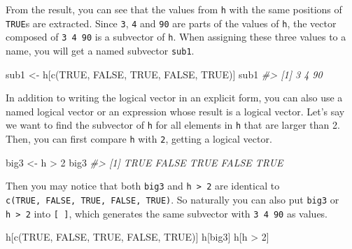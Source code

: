 \documentclass[
]{book}
\newenvironment{Shaded}{\begin{snugshade}}{\end{snugshade}}
\newcommand{\CommentTok}[1]{\textcolor[rgb]{0.56,0.35,0.01}{\textit{#1}}}
\newcommand{\ConstantTok}[1]{\textcolor[rgb]{0.00,0.00,0.00}{#1}}
\newcommand{\DecValTok}[1]{\textcolor[rgb]{0.00,0.00,0.81}{#1}}
\newcommand{\FunctionTok}[1]{\textcolor[rgb]{0.00,0.00,0.00}{#1}}
\newcommand{\NormalTok}[1]{#1}
\newcommand{\OtherTok}[1]{\textcolor[rgb]{0.56,0.35,0.01}{#1}}
\newcommand{\SpecialCharTok}[1]{\textcolor[rgb]{0.00,0.00,0.00}{#1}}
\begin{document}
From the result, you can see that the values from \texttt{h} with the same positions of \texttt{TRUE}s are extracted. Since \texttt{3}, \texttt{4} and \texttt{90} are parts of the values of \texttt{h}, the vector composed of \texttt{3\ 4\ 90} is a subvector of \texttt{h}. When assigning these three values to a name, you will get a named subvector \texttt{sub1}.

\begin{Shaded}
\begin{Highlighting}[]
\NormalTok{sub1 }\OtherTok{\textless{}{-}}\NormalTok{ h[}\FunctionTok{c}\NormalTok{(}\ConstantTok{TRUE}\NormalTok{, }\ConstantTok{FALSE}\NormalTok{, }\ConstantTok{TRUE}\NormalTok{, }\ConstantTok{FALSE}\NormalTok{, }\ConstantTok{TRUE}\NormalTok{)]}
\NormalTok{sub1}
\CommentTok{\#\textgreater{} [1]  3  4 90}
\end{Highlighting}
\end{Shaded}

In addition to writing the logical vector in an explicit form, you can also use a named logical vector or an expression whose result is a logical vector. Let's say we want to find the subvector of \texttt{h} for all elements in \texttt{h} that are larger than 2. Then, you can first compare \texttt{h} with \texttt{2}, getting a logical vector.

\begin{Shaded}
\begin{Highlighting}[]
\NormalTok{big3 }\OtherTok{\textless{}{-}}\NormalTok{ h }\SpecialCharTok{\textgreater{}} \DecValTok{2}
\NormalTok{big3}
\CommentTok{\#\textgreater{} [1]  TRUE FALSE  TRUE FALSE  TRUE}
\end{Highlighting}
\end{Shaded}

Then you may notice that both \texttt{big3} and \texttt{h\ \textgreater{}\ 2} are identical to \texttt{c(TRUE,\ FALSE,\ TRUE,\ FALSE,\ TRUE)}. So naturally you can also put \texttt{big3} or \texttt{h\ \textgreater{}\ 2} into \texttt{{[}\ {]}}, which generates the same subvector with \texttt{3\ 4\ 90} as values.

\begin{Shaded}
\begin{Highlighting}[]
\NormalTok{h[}\FunctionTok{c}\NormalTok{(}\ConstantTok{TRUE}\NormalTok{, }\ConstantTok{FALSE}\NormalTok{, }\ConstantTok{TRUE}\NormalTok{, }\ConstantTok{FALSE}\NormalTok{, }\ConstantTok{TRUE}\NormalTok{)]}
\NormalTok{h[big3]}
\NormalTok{h[h }\SpecialCharTok{\textgreater{}} \DecValTok{2}\NormalTok{]}
\end{Highlighting}
\end{Shaded}
\end{document}
